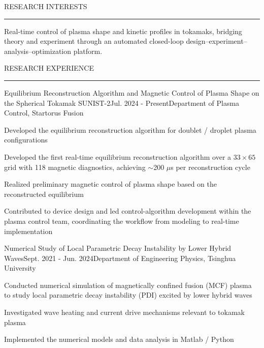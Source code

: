 \documentclass{resume} %
\renewenvironment{rSection}[1]{
\sectionskip
\textcolor{TsinghuaPurple}{\MakeUppercase{#1}}
\sectionlineskip
\hrule
\begin{list}{}{
\setlength{\leftmargin}{0em}
}
\item[]
}{
\end{list}
}
\begin{document}
\begin{rSection}{RESEARCH INTERESTS}

Real-time control of plasma shape and kinetic profiles in tokamaks, bridging theory and experiment through an automated closed-loop design--experiment--analysis--optimization platform.
\end{rSection}


\begin{rSection}{RESEARCH Experience}

\begin{rSubsection}{Equilibrium Reconstruction Algorithm and Magnetic Control of Plasma Shape on the Spherical Tokamak SUNIST-2}{Jul. 2024 - Present}{Department of Plasma Control, Startorus Fusion}{}

\item Developed the equilibrium reconstruction algorithm for doublet / droplet plasma configurations
\item Developed the first real-time equilibrium reconstruction algorithm over a $33 \times 65$ grid with 118 magnetic diagnostics, achieving $\sim$200 $\mu$s per reconstruction cycle
\item Realized preliminary magnetic control of plasma shape based on the reconstructed equilibrium
\item Contributed to device design and led control-algorithm development within the plasma control team, coordinating the workflow from modeling to real-time implementation

\end{rSubsection}


\begin{rSubsection}{Numerical Study of Local Parametric Decay Instability by Lower Hybrid Waves}{Sept. 2021 - Jun. 2024}{Department of Engineering Physics, Tsinghua University}{}

\item Conducted numerical simulation of magnetically confined fusion (MCF) plasma to study local parametric decay instability (PDI) excited by lower hybrid waves
\item Investigated wave heating and current drive mechanisms relevant to tokamak plasma
\item Implemented the numerical models and data analysis in Matlab / Python


\end{rSubsection}
\end{rSection}
\end{document}
